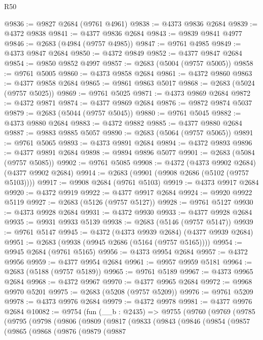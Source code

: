 \begin{lexlean}{R50}
\begin{coremodule}
@9836 := @9827 @2684 (@9761 @4961)
@9838 := @4373 @9836 @2684
@9839 := @4372 @9838
@9841 := @4377 @9836 @2684
@9843 := @9839 @9841 @4977
@9846 := @2683 (@4984 (@9757 @4985))
@9847 := @9761 @4985
@9849 := @4373 @9847 @2684
@9850 := @4372 @9849
@9852 := @4377 @9847 @2684
@9854 := @9850 @9852 @4997
@9857 := @2683 (@5004 (@9757 @5005))
@9858 := @9761 @5005
@9860 := @4373 @9858 @2684
@9861 := @4372 @9860
@9863 := @4377 @9858 @2684
@9865 := @9861 @9863 @5017
@9868 := @2683 (@5024 (@9757 @5025))
@9869 := @9761 @5025
@9871 := @4373 @9869 @2684
@9872 := @4372 @9871
@9874 := @4377 @9869 @2684
@9876 := @9872 @9874 @5037
@9879 := @2683 (@5044 (@9757 @5045))
@9880 := @9761 @5045
@9882 := @4373 @9880 @2684
@9883 := @4372 @9882
@9885 := @4377 @9880 @2684
@9887 := @9883 @9885 @5057
@9890 := @2683 (@5064 (@9757 @5065))
@9891 := @9761 @5065
@9893 := @4373 @9891 @2684
@9894 := @4372 @9893
@9896 := @4377 @9891 @2684
@9898 := @9894 @9896 @5077
@9901 := @2683 (@5084 (@9757 @5085))
@9902 := @9761 @5085
@9908 := @4372 (@4373 @9902 @2684) (@4377 @9902 @2684)
@9914 := @2683 (@9901 (@9908 @2686 (@5102 (@9757 @5103))))
@9917 := @9908 @2684 (@9761 @5103)
@9919 := @4373 @9917 @2684
@9920 := @4372 @9919
@9922 := @4377 @9917 @2684
@9924 := @9920 @9922 @5119
@9927 := @2683 (@5126 (@9757 @5127))
@9928 := @9761 @5127
@9930 := @4373 @9928 @2684
@9931 := @4372 @9930
@9933 := @4377 @9928 @2684
@9935 := @9931 @9933 @5139
@9938 := @2683 (@5146 (@9757 @5147))
@9939 := @9761 @5147
@9945 := @4372 (@4373 @9939 @2684) (@4377 @9939 @2684)
@9951 := @2683 (@9938 (@9945 @2686 (@5164 (@9757 @5165))))
@9954 := @9945 @2684 (@9761 @5165)
@9956 := @4373 @9954 @2684
@9957 := @4372 @9956
@9959 := @4377 @9954 @2684
@9961 := @9957 @9959 @5181
@9964 := @2683 (@5188 (@9757 @5189))
@9965 := @9761 @5189
@9967 := @4373 @9965 @2684
@9968 := @4372 @9967
@9970 := @4377 @9965 @2684
@9972 := @9968 @9970 @5201
@9975 := @2683 (@5208 (@9757 @5209))
@9976 := @9761 @5209
@9978 := @4373 @9976 @2684
@9979 := @4372 @9978
@9981 := @4377 @9976 @2684
@10082 := @9754
    (fun (__b : @2435) =>
    @9755
      (@9760
        (@9769
          (@9785
            (@9795
              (@9798
                (@9806
                  (@9809
                    (@9817
                      (@9833
                        (@9843
                          (@9846
                            (@9854
                              (@9857
                                (@9865
                                  (@9868
                                    (@9876
                                      (@9879
                                        (@9887

\end{coremodule}
\end{lexlean}
